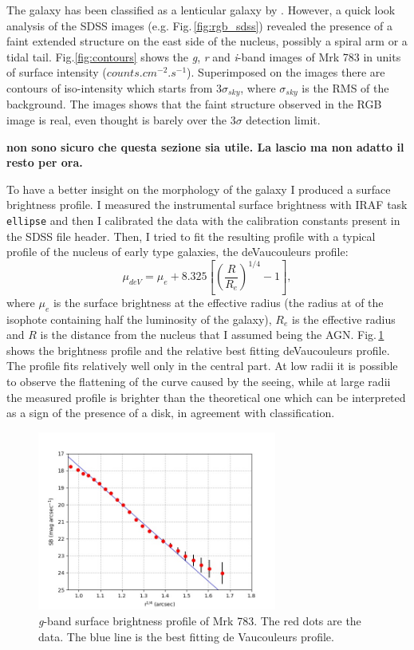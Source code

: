 \documentclass[../main.tex]{subfiles}
\begin{document}
The galaxy has been classified as a lenticular galaxy by \citep{Petrosian07}.
However, a quick look analysis of the SDSS images (e.g. Fig.\,\ref{fig:rgb_sdss}) revealed the presence of a faint extended structure on the east side of the nucleus, possibly a spiral arm or a tidal tail.
Fig.\ref{fig:contours} shows the \emph{g}, \emph{r} and \emph{i}-band images of Mrk 783 in units of surface intensity ($\si{counts.cm^{-2}.s^{-1}}$).
Superimposed on the images there are contours of iso-intensity which starts from $3\sigma_{sky}$, where $\sigma_{sky}$ is the RMS of the background.
The images shows that the faint structure observed in the RGB image is real, even thought is barely over the $3\sigma$ detection limit.


\textbf{non sono sicuro che questa sezione sia utile. La lascio ma non adatto il resto per ora.}

To have a better insight on the morphology of the galaxy I produced a surface brightness profile.
I measured the instrumental surface brightness with IRAF task \verb!ellipse! and then I calibrated the data with the calibration constants present in the SDSS file header.
Then, I tried to fit the resulting profile with a typical profile of the nucleus of early type galaxies, the deVaucouleurs profile:
\begin{equation}
    \label{eq:devauc}
    \mu_{deV} = \mu_e + 8.325\left[\left(\frac{R}{R_e}\right)^{1/4}-1\right],
\end{equation}
where $\mu_{e}$ is the surface brightness at the effective radius (the radius at of the isophote containing half the luminosity of the galaxy), $R_e$ is the effective radius and $R$ is the distance from the nucleus that I assumed being the AGN.
Fig.\,\ref{fig:mrk_dev} shows the brightness profile and the relative best fitting deVaucouleurs profile.
The profile fits relatively well only in the central part.
At low radii it is possible to observe the flattening of the curve caused by the seeing, while at large radii the measured profile is brighter than the theoretical one which can be interpreted as a sign of the presence of a disk, in agreement with \citet{Petrosian07} classification.

\begin{figure}
\centering
\includegraphics[width=0.7\textwidth]{images/paper3/devoc.jpg} 
\caption[]{\emph{g}-band surface brightness profile of Mrk 783. The red dots are the data. The blue line is the best fitting de Vaucouleurs profile.} 
\label{fig:mrk_dev}
\end{figure} 
\end{document}
